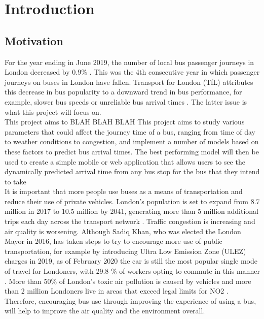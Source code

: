 \section{Introduction}

\subsection{Motivation}

For the year ending in June 2019, the number of local bus passenger journeys in London decreased by 0.9\% \cite{quarterly-bus-stats}. This was the 4th consecutive year in which passenger journeys on buses in London have fallen. Transport for London (TfL) attributes this decrease in bus popularity to a downward trend in bus performance, for example, slower bus speeds or unreliable bus arrival times \cite{annual-bus-stats}. The latter issue is what this project will focus on. \\ 

This project aims to BLAH BLAH BLAH  This project aims to study various parameters that could affect the journey time of a bus, ranging from time of day to weather conditions to congestion, and implement a number of models based on these factors to predict bus arrival times. The best performing model will then be used to create a simple mobile or web application that allows users to see the dynamically predicted arrival time from any bus stop for the bus that they intend to take \\

It is important that more people use buses as a means of transportation and reduce their use of private vehicles. London's population is set to expand from 8.7 million in 2017 to 10.5 million by 2041, generating more than 5 million additional trips each day across the transport network \cite{mayor-reduce-car-use}. Traffic congestion is increasing and air quality is worsening. Although Sadiq Khan, who was elected the London Mayor in 2016, has taken steps to try to encourage more use of public transportation, for example by introducing Ultra Low Emission Zone (ULEZ) charges in 2019, as of February 2020 the car is still the most popular single mode of travel for Londoners, with 29.8 \% of workers opting to commute in this manner \cite{motoring-faqs}. More than 50\% of London's toxic air pollution is caused by vehicles and more than 2 million Londoners live in areas that exceed legal limits for NO2 \cite{mayor-car-free-day}. Therefore, encouraging bus use through improving the experience of using a bus, will help to improve the air quality and the environment overall.

